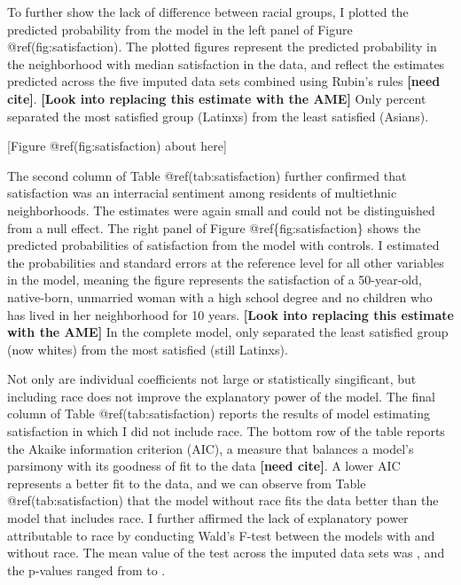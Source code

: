 \documentclass{baderart}
\begin{document}
To further show the lack of difference between racial groups, I plotted the predicted probability from the model in the left panel of Figure @ref(fig:satisfaction). The plotted figures represent the predicted probability in the neighborhood with median satisfaction in the data, and reflect the estimates predicted across the five imputed data sets combined using Rubin's rules \textbf{{[}need cite{]}}. \textbf{{[}Look into replacing this estimate with the AME{]}} Only \maxdiffone percent separated the most satisfied group (Latinxs) from the least satisfied (Asians).

{[}Figure @ref(fig:satisfaction) about here{]}

The second column of Table @ref(tab:satisfaction) further confirmed that satisfaction was an interracial sentiment among residents of multiethnic neighborhoods. The estimates were again small and could not be distinguished from a null effect. The right panel of Figure @ref\{fig:satisfaction\} shows the predicted probabilities of satisfaction from the model with controls. I estimated the probabilities and standard errors at the reference level for all other variables in the model, meaning the figure represents the satisfaction of a 50-year-old, native-born, unmarried woman with a high school degree and no children who has lived in her neighborhood for 10 years. \textbf{{[}Look into replacing this estimate with the AME{]}} In the complete model, only \maxdiffthree separated the least satisfied group (now whites) from the most satisfied (still Latinxs).

Not only are individual coefficients not large or statistically singificant, but including race does not improve the explanatory power of the model. The final column of Table @ref(tab:satisfaction) reports the results of model estimating satisfaction in which I did not include race. The bottom row of the table reports the Akaike information criterion (AIC), a measure that balances a model's parsimony with its goodness of fit to the data \textbf{{[}need cite{]}}. A lower AIC represents a better fit to the data, and we can observe from Table @ref(tab:satisfaction) that the model without race fits the data better than the model that includes race. I further affirmed the lack of explanatory power attributable to race by conducting Wald's F-test between the models with and without race. The mean value of the test across the imputed data sets was \satWaldF, and the p-values ranged from \satWaldpMin to \satWaldpMax.
\end{document}
